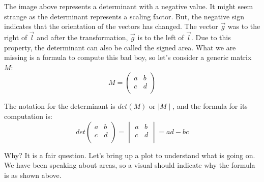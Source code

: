 \documentclass[600paper, 11pt,twoside,openany]{kdp}
\begin{document}
\indent The image above represents a determinant with a negative value. It might seem strange as the determinant represents a scaling factor. But, the negative sign indicates  that the orientation of the vectors has changed. The vector $\overrightarrow{g}$ was to the right of $\overrightarrow{l}$ and after the transformation, $\overrightarrow{g}$ is to the left of $\overrightarrow{l}$. Due to this property, the determinant can also be called the signed area. What we are missing is a formula to compute this bad boy, so let’s consider a generic matrix $M$:
\[M = \begin{pmatrix}
a & b   \\
c & d \\
\end{pmatrix}
\]
\par 
\vspace{-3pt}
\indent The notation for the determinant is $det(M)$ or $\mid M \mid$, and the formula for its computation is:
\begin{equation} \label{eq:det}
det \begin{pmatrix}
a & b   \\
c & d \\
\end{pmatrix} = \begin{vmatrix}
a & b   \\
c & d \\
\end{vmatrix} = ad-bc
\end{equation}
\par 
\vspace{-3pt}
\indent Why? It is a fair question. Let’s bring up a plot to understand what is going on. We have been speaking about areas, so a visual should indicate why the formula is as shown above.
\end{document}
